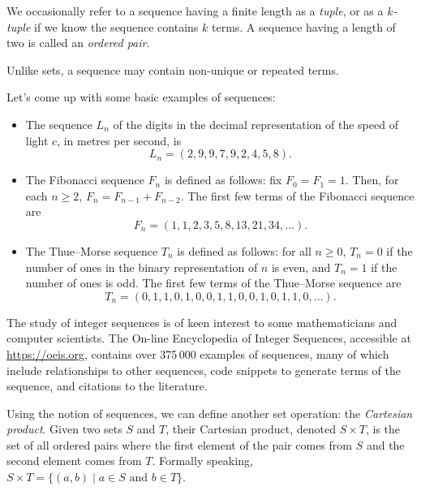 We occasionally refer to a sequence having a finite length as a \emph{tuple}, or as a \emph{$k$-tuple} if we know the sequence contains $k$ terms. A sequence having a length of two is called an \emph{ordered pair}.

Unlike sets, a sequence may contain non-unique or repeated terms.

\begin{example}
Let's come up with some basic examples of sequences:
\begin{itemize}
	\item The sequence $L_{n}$ of the digits in the decimal representation of the speed of light $c$, in metres per second, is
	\begin{equation*}
	L_{n} = (2, 9, 9, 7, 9, 2, 4, 5, 8).
	\end{equation*}
	
	\item The Fibonacci sequence $F_{n}$ is defined as follows: fix $F_{0} = F_{1} = 1$. Then, for each $n \geq 2$, $F_{n} = F_{n-1} + F_{n-2}$. The first few terms of the Fibonacci sequence are
	\begin{equation*}
	F_{n} = (1, 1, 2, 3, 5, 8, 13, 21, 34, \dots).
	\end{equation*}
	
	\item The Thue--Morse sequence $T_{n}$ is defined as follows: for all $n \geq 0$, $T_{n} = 0$ if the number of ones in the binary representation of $n$ is even, and $T_{n} = 1$ if the number of ones is odd. The first few terms of the Thue--Morse sequence are
	\begin{equation*}
	T_{n} = (0, 1, 1, 0, 1, 0, 0, 1, 1, 0, 0, 1, 0, 1, 1, 0, \dots).
	\end{equation*}
\end{itemize}
\end{example}

\begin{remark}
The study of integer sequences is of keen interest to some mathematicians and computer scientists. The On-line Encyclopedia of Integer Sequences, accessible at \url{https://oeis.org}, contains over 375\,000 examples of sequences, many of which include relationships to other sequences, code snippets to generate terms of the sequence, and citations to the literature.
\end{remark}

Using the notion of sequences, we can define another set operation: the \emph{Cartesian product}. Given two sets $S$ and $T$, their Cartesian product, denoted $S \times T$, is the set of all ordered pairs where the first element of the pair comes from $S$ and the second element comes from $T$. Formally speaking, $S \times T = \{(a,b) \mid a \in S \text{ and } b \in T\}$.

